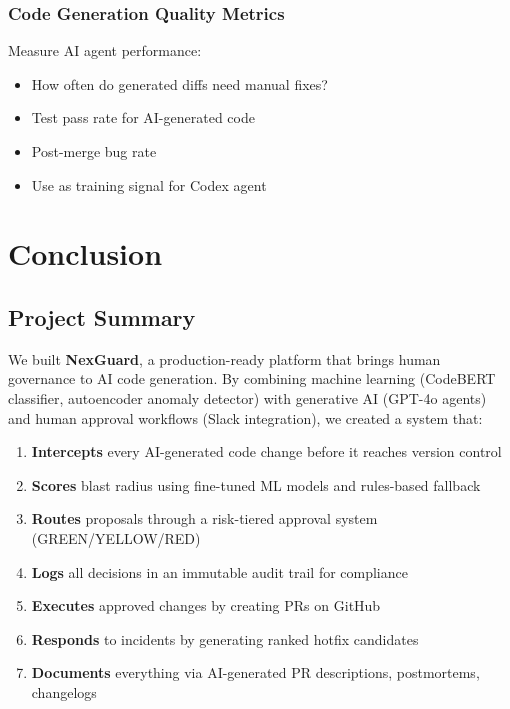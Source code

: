 \documentclass[11pt,a4paper]{article}
\begin{document}
\subsubsection{Code Generation Quality Metrics}
Measure AI agent performance:
\begin{itemize}
    \item How often do generated diffs need manual fixes?
    \item Test pass rate for AI-generated code
    \item Post-merge bug rate
    \item Use as training signal for Codex agent
\end{itemize}

\newpage
\section{Conclusion}

\subsection{Project Summary}

We built \textbf{NexGuard}, a production-ready platform that brings human governance to AI code generation. By combining machine learning (CodeBERT classifier, autoencoder anomaly detector) with generative AI (GPT-4o agents) and human approval workflows (Slack integration), we created a system that:

\begin{enumerate}
    \item \textbf{Intercepts} every AI-generated code change before it reaches version control
    \item \textbf{Scores} blast radius using fine-tuned ML models and rules-based fallback
    \item \textbf{Routes} proposals through a risk-tiered approval system (GREEN/YELLOW/RED)
    \item \textbf{Logs} all decisions in an immutable audit trail for compliance
    \item \textbf{Executes} approved changes by creating PRs on GitHub
    \item \textbf{Responds} to incidents by generating ranked hotfix candidates
    \item \textbf{Documents} everything via AI-generated PR descriptions, postmortems, changelogs
\end{enumerate}
\end{document}
